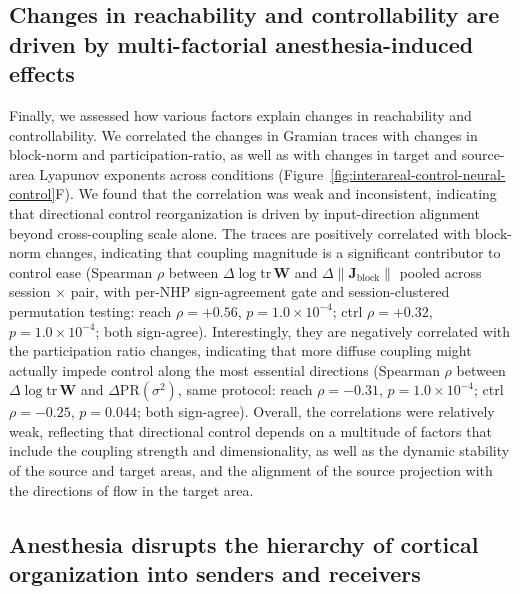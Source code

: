 \subsection{Changes in reachability and controllability are driven by multi-factorial anesthesia-induced effects}
\label{sec:interareal-control-multifactor}

Finally, we assessed how various factors explain changes in reachability and controllability. We correlated the changes in Gramian traces with changes in block-norm and participation-ratio, as well as with changes in target and source-area Lyapunov exponents across conditions (Figure~\ref{fig:interareal-control-neural-control}F). We found that the correlation was weak and inconsistent, indicating that directional control reorganization is driven by input-direction alignment beyond cross-coupling scale alone. The traces are positively correlated with block-norm changes, indicating that coupling magnitude is a significant contributor to control ease (Spearman $\rho$ between $\Delta\log\mathrm{tr}\,\mathbf{W}$ and $\Delta\|\mathbf{J}_{\mathrm{block}}\|$ pooled across session $\times$ pair, with per-NHP sign-agreement gate and session-clustered permutation testing: reach $\rho=+0.56$, $p=1.0\!\times\!10^{-4}$; ctrl $\rho=+0.32$, $p=1.0\!\times\!10^{-4}$; both sign-agree). Interestingly, they are negatively correlated with the participation ratio changes, indicating that more diffuse coupling might actually impede control along the most essential directions (Spearman $\rho$ between $\Delta\log\mathrm{tr}\,\mathbf{W}$ and $\Delta\mathrm{PR}(\sigma^2)$, same protocol: reach $\rho=-0.31$, $p=1.0\!\times\!10^{-4}$; ctrl $\rho=-0.25$, $p=0.044$; both sign-agree). Overall, the correlations were relatively weak, reflecting that directional control depends on a multitude of factors that include the coupling strength and dimensionality, as well as the dynamic stability of the source and target areas, and the alignment of the source projection with the directions of flow in the target area.

\subsection{Anesthesia disrupts the hierarchy of cortical organization into senders and receivers}
\label{sec:interareal-control-area-roles}

